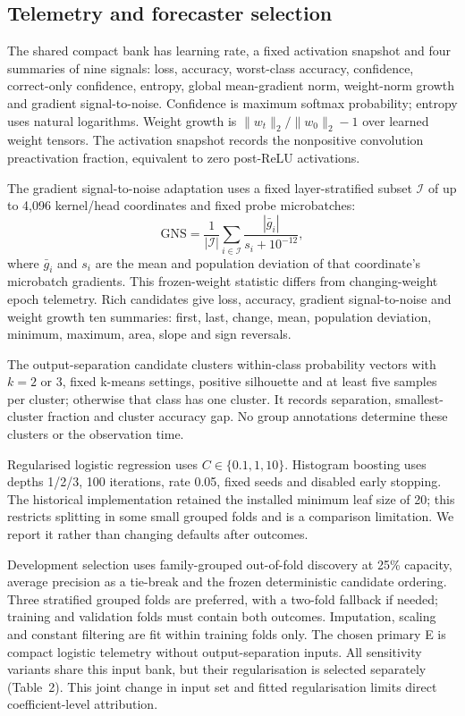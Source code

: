 \subsection{Telemetry and forecaster selection}
The shared compact bank has learning rate, a fixed activation snapshot and four summaries of nine signals: loss, accuracy, worst-class accuracy, confidence, correct-only confidence, entropy, global mean-gradient norm, weight-norm growth and gradient signal-to-noise. Confidence is maximum softmax probability; entropy uses natural logarithms. Weight growth is $\|w_t\|_2/\|w_0\|_2-1$ over learned weight tensors. The activation snapshot records the nonpositive convolution preactivation fraction, equivalent to zero post-ReLU activations.

The gradient signal-to-noise adaptation uses a fixed layer-stratified subset $\mathcal I$ of up to 4,096 kernel/head coordinates and fixed probe microbatches:
\begin{equation}
\mathrm{GNS}=\frac{1}{|\mathcal I|}\sum_{i\in\mathcal I}\frac{|\bar g_i|}{s_i+10^{-12}},
\label{eq:gns}
\tag{8}\end{equation}
where $\bar g_i$ and $s_i$ are the mean and population deviation of that coordinate's microbatch gradients. This frozen-weight statistic differs from changing-weight epoch telemetry. Rich candidates give loss, accuracy, gradient signal-to-noise and weight growth ten summaries: first, last, change, mean, population deviation, minimum, maximum, area, slope and sign reversals.

The output-separation candidate clusters within-class probability vectors with $k=2$ or $3$, fixed k-means settings, positive silhouette and at least five samples per cluster; otherwise that class has one cluster. It records separation, smallest-cluster fraction and cluster accuracy gap. No group annotations determine these clusters or the observation time.

Regularised logistic regression uses $C\in\{0.1,1,10\}$. Histogram boosting uses depths 1/2/3, 100 iterations, rate 0.05, fixed seeds and disabled early stopping. The historical implementation retained the installed minimum leaf size of 20; this restricts splitting in some small grouped folds and is a comparison limitation. We report it rather than changing defaults after outcomes.

Development selection uses family-grouped out-of-fold discovery at 25\% capacity, average precision as a tie-break and the frozen deterministic candidate ordering. Three stratified grouped folds are preferred, with a two-fold fallback if needed; training and validation folds must contain both outcomes. Imputation, scaling and constant filtering are fit within training folds only. The chosen primary E is compact logistic telemetry without output-separation inputs. All sensitivity variants share this input bank, but their regularisation is selected separately (Table~2). This joint change in input set and fitted regularisation limits direct coefficient-level attribution.

